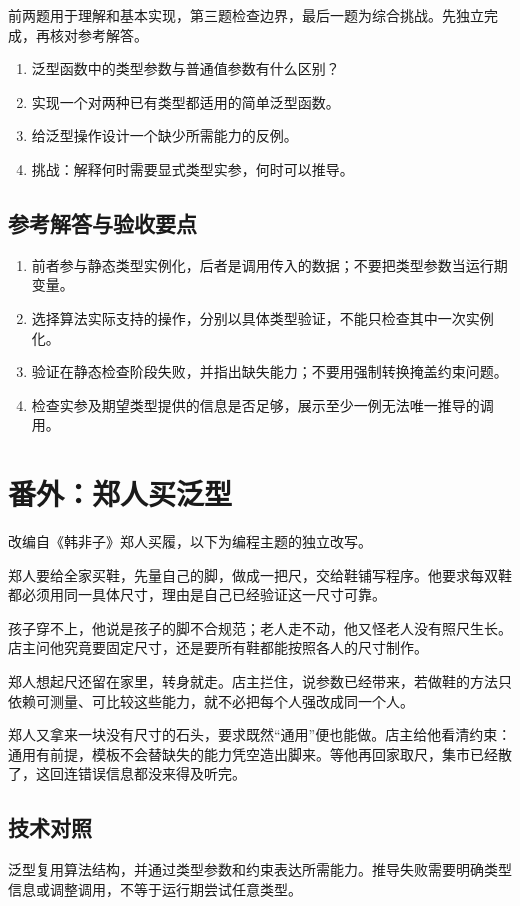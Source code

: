 前两题用于理解和基本实现，第三题检查边界，最后一题为综合挑战。先独立完成，再核对参考解答。

\begin{enumerate}

\item 泛型函数中的类型参数与普通值参数有什么区别？

\item 实现一个对两种已有类型都适用的简单泛型函数。

\item 给泛型操作设计一个缺少所需能力的反例。

\item 挑战：解释何时需要显式类型实参，何时可以推导。

\end{enumerate}

\subsection*{参考解答与验收要点}

\begin{enumerate}

\item 前者参与静态类型实例化，后者是调用传入的数据；不要把类型参数当运行期变量。

\item 选择算法实际支持的操作，分别以具体类型验证，不能只检查其中一次实例化。

\item 验证在静态检查阶段失败，并指出缺失能力；不要用强制转换掩盖约束问题。

\item 检查实参及期望类型提供的信息是否足够，展示至少一例无法唯一推导的调用。

\end{enumerate}

\section{番外：郑人买泛型}

改编自《韩非子》郑人买履，以下为编程主题的独立改写。

郑人要给全家买鞋，先量自己的脚，做成一把尺，交给鞋铺写程序。他要求每双鞋都必须用同一具体尺寸，理由是自己已经验证这一尺寸可靠。

孩子穿不上，他说是孩子的脚不合规范；老人走不动，他又怪老人没有照尺生长。店主问他究竟要固定尺寸，还是要所有鞋都能按照各人的尺寸制作。

郑人想起尺还留在家里，转身就走。店主拦住，说参数已经带来，若做鞋的方法只依赖可测量、可比较这些能力，就不必把每个人强改成同一个人。

郑人又拿来一块没有尺寸的石头，要求既然“通用”便也能做。店主给他看清约束：通用有前提，模板不会替缺失的能力凭空造出脚来。等他再回家取尺，集市已经散了，这回连错误信息都没来得及听完。

\subsection*{技术对照}

泛型复用算法结构，并通过类型参数和约束表达所需能力。推导失败需要明确类型信息或调整调用，不等于运行期尝试任意类型。
